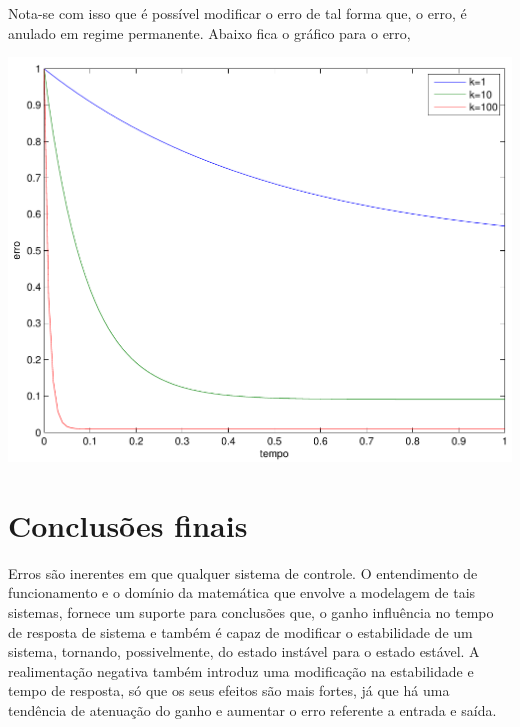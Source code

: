 \documentclass[paper=a4, fontsize=11pt]{article}
\begin{document}
Nota-se com isso que é possível modificar o erro de tal forma que, o erro, é anulado em regime
permanente. Abaixo fica o gráfico para o erro,

\begin{center}
    \includegraphics[scale=0.5]{q7icerro.pdf}
\end{center}


\section{Conclusões finais}

Erros são inerentes em que qualquer sistema de controle. O entendimento de funcionamento e o 
domínio da matemática que envolve a modelagem de tais sistemas, fornece um suporte para
conclusões que, o ganho influência no tempo de resposta de sistema e também é capaz de 
modificar o estabilidade de um sistema, tornando, possivelmente, do estado instável para
o estado estável. A realimentação negativa também introduz uma modificação na estabilidade
e tempo de resposta, só que os seus efeitos são mais fortes, já que há uma tendência de 
atenuação do ganho e aumentar o erro referente a entrada e saída.
\end{document}
